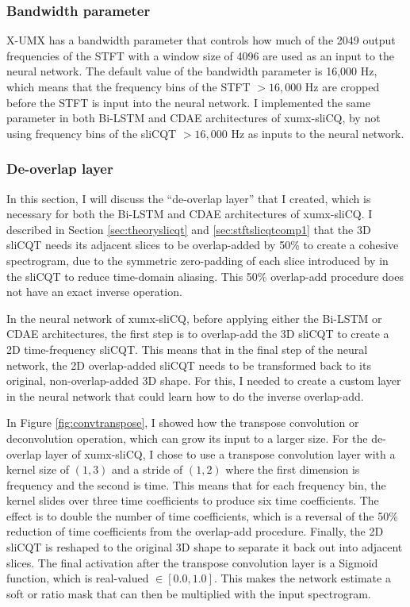 \documentclass[report.tex]{subfiles}
\begin{document}
\subsubsection{Bandwidth parameter}
\label{sec:bandwidth}

X-UMX has a bandwidth parameter that controls how much of the 2049 output frequencies of the STFT with a window size of 4096 are used as an input to the neural network. The default value of the bandwidth parameter is 16,000 Hz, which means that the frequency bins of the STFT $> 16,000 \text{ Hz}$ are cropped before the STFT is input into the neural network. I implemented the same parameter in both Bi-LSTM and CDAE architectures of xumx-sliCQ, by not using frequency bins of the sliCQT $> 16,000 \text{ Hz}$ as inputs to the neural network.

\subsubsection{De-overlap layer}
\label{sec:deoverlap}

In this section, I will discuss the ``de-overlap layer'' that I created, which is necessary for both the Bi-LSTM and CDAE architectures of xumx-sliCQ. I described in Section \ref{sec:theoryslicqt} and \ref{sec:stftslicqtcomp1} that the 3D sliCQT needs its adjacent slices to be overlap-added by 50\% to create a cohesive spectrogram, due to the symmetric zero-padding of each slice introduced by \textcite{slicq} in the sliCQT to reduce time-domain aliasing. This 50\% overlap-add procedure does not have an exact inverse operation.

In the neural network of xumx-sliCQ, before applying either the Bi-LSTM or CDAE architectures, the first step is to overlap-add the 3D sliCQT to create a 2D time-frequency sliCQT. This means that in the final step of the neural network, the 2D overlap-added sliCQT needs to be transformed back to its original, non-overlap-added 3D shape. For this, I needed to create a custom layer in the neural network that could learn how to do the inverse overlap-add.

In Figure \ref{fig:convtranspose}, I showed how the transpose convolution or deconvolution operation, which can grow its input to a larger size. For the de-overlap layer of xumx-sliCQ, I chose to use a transpose convolution layer with a kernel size of $(1, 3)$ and a stride of $(1, 2)$ where the first dimension is frequency and the second is time. This means that for each frequency bin, the kernel slides over three time coefficients to produce six time coefficients. The effect is to double the number of time coefficients, which is a reversal of the 50\% reduction of time coefficients from the overlap-add procedure. Finally, the 2D sliCQT is reshaped to the original 3D shape to separate it back out into adjacent slices. The final activation after the transpose convolution layer is a Sigmoid function, which is real-valued $\in [0.0, 1.0]$. This makes the network estimate a soft or ratio mask that can then be multiplied with the input spectrogram.
\end{document}
